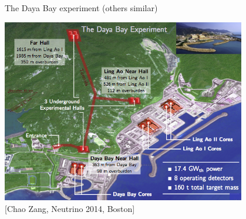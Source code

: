 \begin{frame}{The Daya Bay experiment (others similar)}

\centering
\includegraphics[width=0.80\textwidth]{./images/3nu/reactor/dayabay_configuration.png}\\
{\scriptsize \color{blue}[Chao Zang, Neutrino 2014, Boston]}
\end{frame}


